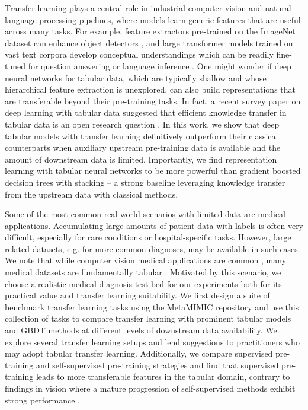 Transfer learning plays a central role in industrial computer vision and natural language processing pipelines, where models learn generic features that are useful across many tasks. For example, feature extractors pre-trained on the ImageNet dataset can enhance object detectors \citep{ren2015faster}, and large transformer models trained on vast text corpora develop conceptual understandings which can be readily fine-tuned for question answering or language inference \citep{devlin2019bert}. One might wonder if deep neural networks for tabular data, which are typically shallow and whose hierarchical feature extraction is unexplored, can also build representations that are transferable beyond their pre-training tasks. In fact, a recent survey paper on deep learning with tabular data suggested that efficient knowledge transfer in tabular data is an open research question \citep{borisov2021deep}. In this work, we show that deep tabular models with transfer learning definitively outperform their classical counterparts when auxiliary upstream pre-training data is available and the amount of downstream data is limited. Importantly, we find representation learning with tabular neural networks to be more powerful than gradient boosted decision trees with stacking -- a strong baseline leveraging knowledge transfer from the upstream data with classical methods. 

Some of the most common real-world scenarios with limited data are medical applications. Accumulating large amounts of patient data with labels is often very difficult, especially for rare conditions or hospital-specific tasks. However, large related datasets, e.g. for more common diagnoses, may be available in such cases. We note that while computer vision medical applications are common \citep{irvin2019chexpert, santa2021public, chen2018u, turbe2021deep}, many medical datasets are fundamentally tabular \citep{goldberger2000physiobank, mimiciv_v1, johnson2016mimic, law2009dicom}. Motivated by this scenario, we choose a realistic medical diagnosis test bed for our experiments both for its practical value and transfer learning suitability. We first design a suite of benchmark transfer learning tasks using the MetaMIMIC repository \citep{metaMIMIC_github, woznica2022consolidated} and use this collection of tasks to compare transfer learning with prominent tabular models and GBDT methods at different levels of downstream data availability. We explore several transfer learning setups and lend suggestions to practitioners who may adopt tabular transfer learning. Additionally, we compare supervised pre-training and self-supervised pre-training strategies and find that supervised pre-training leads to more transferable features in the tabular domain, contrary to findings in vision where a mature progression of self-supervised methods exhibit strong performance \citep{he2020momentum}. 

